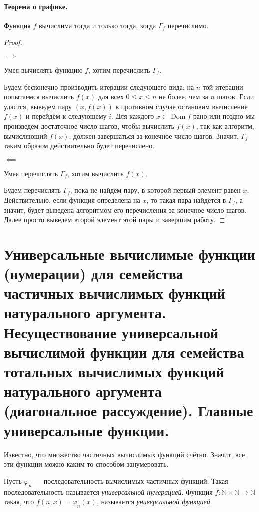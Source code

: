 \documentclass{article}
\begin{document}
    \paragraph{Теорема о графике.} Функция $f$ вычислима тогда и только тогда, когда $\Gamma_f$
    перечислимо.
    \begin{proof}\

        $\implies$

        Умея вычислять функцию $f$, хотим перечислить $\Gamma_f$.

        Будем бесконечно производить итерации следующего вида: на $n$-той итерации попытаемся
        вычислить $f(x)$ для всех $0 \leqslant x \leqslant n$ не более, чем за $n$ шагов.
        Если удастся, выведем пару $(x, f(x))$ в противном случае остановим вычисление $f(x)$
        и перейдём к следующему $i$. Для каждого $x \in \operatorname{Dom} f$ рано или поздно мы
        произведём достаточное число шагов, чтобы вычислить $f(x)$, так как алгоритм, вычисляющий
        $f(x)$, должен завершаться за конечное число шагов. Значит, $\Gamma_f$ таким образом
        действительно будет перечислено.

        $\impliedby$

        Умея перечислять $\Gamma_f$, хотим вычислить $f(x)$.

        Будем перечислять $\Gamma_f$, пока не найдём пару, в которой первый элемент равен $x$.
        Действительно, если функция определена на $x$, то такая пара найдётся в $\Gamma_f$,
        а значит, будет выведена алгоритмом его перечисления за конечное число шагов. Далее просто
        выведем второй элемент этой пары и завершим работу.

    \end{proof}

    \section{Универсальные вычислимые функции (нумерации) для семейства частичных вычислимых
    функций натурального аргумента. Несуществование универсальной вычислимой функции для
    семейства тотальных вычислимых функций натурального аргумента (диагональное рассуждение).
    Главные универсальные функции.}

    Известно, что множество частичных вычислимых функций счётно. Значит, все эти функции можно
    каким-то способом занумеровать.

    \begin{definition}
        Пусть $\varphi_n$ --- последовательность вычислимых частичных функций. Такая
        последовательность называется \textit{универсальной нумерацией}. Функция $f:
        \mathbb{N} \times \mathbb{N} \to \mathbb{N}$ такая, что $f(n, x) = \varphi_n(x)$, называется
        \textit{универсальной функцией}.
    \end{definition}
\end{document}
